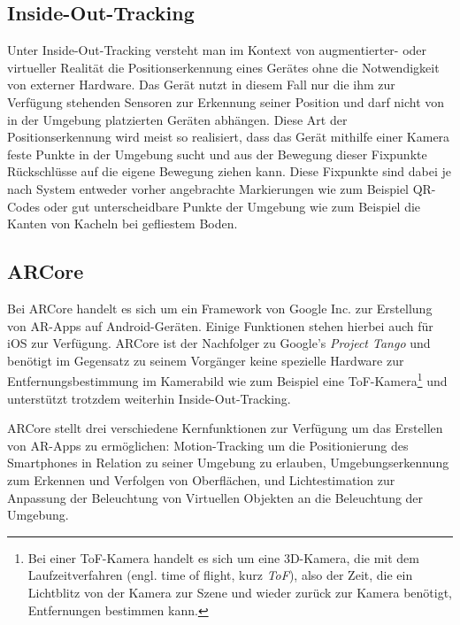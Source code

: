 \documentclass[10pt]{scrartcl}
\begin{document}
\subsection{Inside-Out-Tracking}
Unter Inside-Out-Tracking versteht man im Kontext von augmentierter- oder virtueller Realität die Positionserkennung eines Gerätes ohne die Notwendigkeit von externer Hardware. Das Gerät nutzt in diesem Fall nur die ihm zur Verfügung stehenden Sensoren zur Erkennung seiner Position und darf nicht von in der Umgebung platzierten Geräten abhängen. Diese Art der Positionserkennung wird meist so realisiert, dass das Gerät mithilfe einer Kamera feste Punkte in der Umgebung sucht und aus der Bewegung dieser Fixpunkte Rückschlüsse auf die eigene Bewegung ziehen kann. Diese Fixpunkte sind dabei je nach System entweder vorher angebrachte Markierungen wie zum Beispiel QR-Codes oder gut unterscheidbare Punkte der Umgebung wie zum Beispiel die Kanten von Kacheln bei gefliestem Boden. 

\subsection{ARCore}
Bei ARCore handelt es sich um ein Framework von Google Inc. zur Erstellung von AR-Apps auf Android-Geräten. Einige Funktionen stehen hierbei auch für iOS zur Verfügung. ARCore ist der Nachfolger zu Google's \textit{Project Tango} und benötigt im Gegensatz zu seinem Vorgänger keine spezielle Hardware zur Entfernungsbestimmung im Kamerabild wie zum Beispiel eine ToF-Kamera\footnote{Bei einer ToF-Kamera handelt es sich um eine 3D-Kamera, die mit dem Laufzeitverfahren (engl. time of flight, kurz \textit{ToF}), also der Zeit, die ein Lichtblitz von der Kamera zur Szene und wieder zurück zur Kamera benötigt, Entfernungen bestimmen kann.} und unterstützt trotzdem weiterhin Inside-Out-Tracking.

ARCore stellt drei \cite{google2018} verschiedene Kernfunktionen zur Verfügung um das Erstellen von AR-Apps zu ermöglichen: Motion-Tracking um die Positionierung des Smartphones in Relation zu seiner Umgebung zu erlauben, Umgebungserkennung zum Erkennen und Verfolgen von Oberflächen, und Lichtestimation zur Anpassung der Beleuchtung von Virtuellen Objekten an die Beleuchtung der Umgebung.
\end{document}
